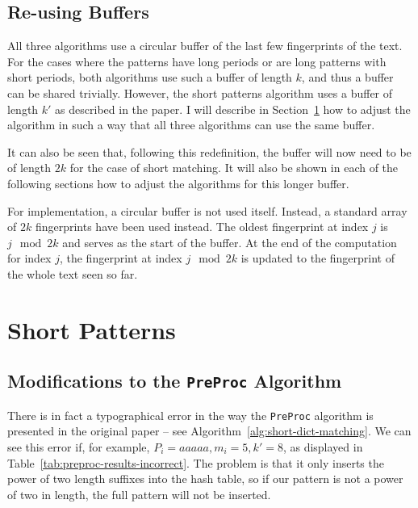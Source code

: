 \documentclass[ %
                    author={Dominic Joseph Moylett},
                    degree={MEng},
                     title={Dictionary Matching with Fingerprints},
                  subtitle={An Empirical Analysis},
                      type={research},
                      year={2015} ]{dissertation}
\begin{document}
\subsection{Re-using Buffers}

All three algorithms use a circular buffer of the last few fingerprints of the text. For the cases where the patterns have long periods or are long patterns with short periods, both algorithms use such a buffer of length $k$, and thus a buffer can be shared trivially. However, the short patterns algorithm uses a buffer of length $k'$ as described in the paper. I will describe in Section~\ref{sec:impl-short} how to adjust the algorithm in such a way that all three algorithms can use the same buffer.

It can also be seen that, following this redefinition, the buffer will now need to be of length $2k$ for the case of short matching. It will also be shown in each of the following sections how to adjust the algorithms for this longer buffer.

For implementation, a circular buffer is not used itself. Instead, a standard array of $2k$ fingerprints have been used instead. The oldest fingerprint at index $j$ is $j \mod 2k$ and serves as the start of the buffer. At the end of the computation for index $j$, the fingerprint at index $j \mod 2k$ is updated to the fingerprint of the whole text seen so far.

\section{Short Patterns}
\label{sec:impl-short}

\subsection{Modifications to the \texttt{PreProc} Algorithm}

There is in fact a typographical error in the way the \texttt{PreProc} algorithm is presented in the original paper -- see Algorithm~\ref{alg:short-dict-matching}. We can see this error if, for example, $P_i = aaaaa, m_i = 5, k' = 8$, as displayed in Table~\ref{tab:preproc-results-incorrect}. The problem is that it only inserts the power of two length suffixes into the hash table, so if our pattern is not a power of two in length, the full pattern will not be inserted.
\end{document}
